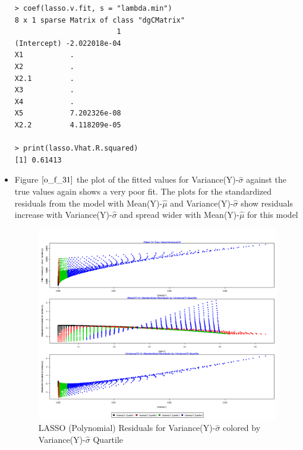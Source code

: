 \documentclass[twoside,12pt]{article}
\begin{document}
\begin{itemize}
\begin{verbatim}
> coef(lasso.v.fit, s = "lambda.min")
8 x 1 sparse Matrix of class "dgCMatrix"
                        1
(Intercept) -2.022018e-04
X1           .           
X2           .           
X2.1         .           
X3           .           
X4           .           
X5           7.202326e-08
X2.2         4.118209e-05

> print(lasso.Vhat.R.squared)
[1] 0.61413

\end{verbatim}

\FloatBarrier
\item
Figure $\eqref{o_f_31}$ the plot of the fitted values for Variance(Y)-$\hat{\sigma}$ against the true values again shows a very poor fit.  The plots for the standardized residuals from the model with Mean(Y)-$\hat{\mu}$ and Variance(Y)-$\hat{\sigma}$ show residuals increase with Variance(Y)-$\hat{\sigma}$ and spread wider with Mean(Y)-$\hat{\mu}$ for this model
\FloatBarrier
\begin{figure}[!htbp]
\centering
\includegraphics[scale=.50]{images/mt_rse_plot_var_v_trg_lasso_poly.png} 
\caption{LASSO (Polynomial) Residuals for  Variance(Y)-$\hat{\sigma}$ colored by Variance(Y)-$\hat{\sigma}$ Quartile}
\label{o_f_31}
\end{figure}


\end{itemize}
\end{document}
